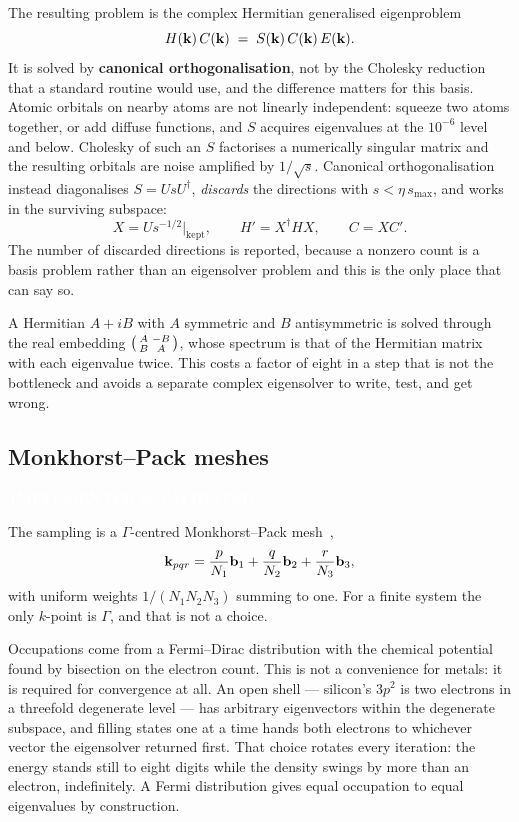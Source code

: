 \documentclass[11pt,a4paper]{article}
\newcommand{\badge}[2]{%
  \par\vspace{2pt}\noindent
  \colorbox{#1}{\textcolor{white}{\small\bfseries\,#2\,}}\par\vspace{4pt}}
\newcommand{\implemented}{\badge{okgreen}{IMPLEMENTED \& VALIDATED}}
\begin{document}
The resulting problem is the complex Hermitian generalised eigenproblem
\begin{equation}
  H(\vb{k})\,C(\vb{k}) \;=\; S(\vb{k})\,C(\vb{k})\,E(\vb{k}).
\end{equation}
It is solved by \textbf{canonical orthogonalisation}, not by the Cholesky
reduction that a standard routine would use, and the difference matters for
this basis. Atomic orbitals on nearby atoms are not linearly independent:
squeeze two atoms together, or add diffuse functions, and $S$ acquires
eigenvalues at the $10^{-6}$ level and below. Cholesky of such an $S$
factorises a numerically singular matrix and the resulting orbitals are noise
amplified by $1/\sqrt{s}$. Canonical orthogonalisation instead diagonalises
$S = U s U^{\dagger}$, \emph{discards} the directions with
$s < \eta\, s_{\max}$, and works in the surviving subspace:
\begin{equation}
  X = U s^{-1/2}\big|_{\text{kept}},
  \qquad
  H' = X^{\dagger} H X,
  \qquad
  C = X C' .
\end{equation}
The number of discarded directions is reported, because a nonzero count is a
basis problem rather than an eigensolver problem and this is the only place
that can say so.

A Hermitian $A + iB$ with $A$ symmetric and $B$ antisymmetric is solved
through the real embedding
$\begin{psmallmatrix} A & -B \\ B & A \end{psmallmatrix}$,
whose spectrum is that of the Hermitian matrix with each eigenvalue twice.
This costs a factor of eight in a step that is not the bottleneck and avoids a
separate complex eigensolver to write, test, and get wrong.

\subsection{Monkhorst--Pack meshes}
\implemented

The sampling is a $\Gamma$-centred Monkhorst--Pack mesh~\cite{mp},
\begin{equation}
  \vb{k}_{pqr} = \frac{p}{N_1}\vb{b}_1 + \frac{q}{N_2}\vb{b}_2
               + \frac{r}{N_3}\vb{b}_3,
\end{equation}
with uniform weights $1/(N_1N_2N_3)$ summing to one. For a finite system the
only $k$-point is $\Gamma$, and that is not a choice.

Occupations come from a Fermi--Dirac distribution with the chemical potential
found by bisection on the electron count. This is not a convenience for
metals: it is required for convergence at all. An open shell --- silicon's
$3p^2$ is two electrons in a threefold degenerate level --- has arbitrary
eigenvectors within the degenerate subspace, and filling states one at a time
hands both electrons to whichever vector the eigensolver returned first. That
choice rotates every iteration: the energy stands still to eight digits while
the density swings by more than an electron, indefinitely. A Fermi
distribution gives equal occupation to equal eigenvalues by construction.
\end{document}
